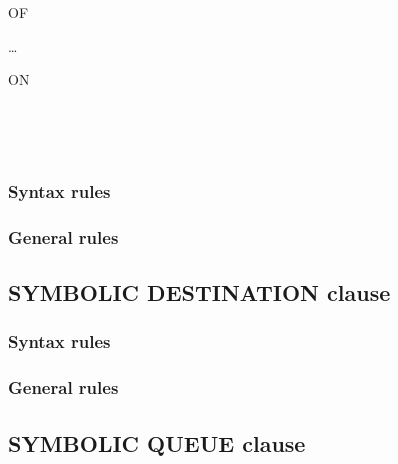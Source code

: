 \begin{syntax}
   OF
  \begin{1=}
  \end{1=}\ldots
  \begin{0-1}
    \begin{1=}
       ON
      \begin{1=}
        \identifier \\
      \end{1=} \\

       \identifier
  \end{1=}
  \end{0-1}
\end{syntax}

\subsubsection{Syntax rules}

\subsubsection{General rules}

\subsection{SYMBOLIC DESTINATION clause}

\begin{syntax}[\deletedcolour]
\end{syntax}

\subsubsection{Syntax rules}

\subsubsection{General rules}

\subsection{SYMBOLIC QUEUE clause}

\begin{syntax}[\deletedcolour]
\end{syntax}

